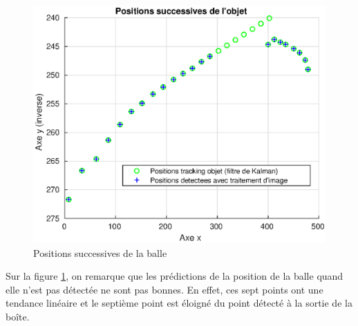 \begin{figure}[H]
\caption{Positions successives de la balle}
\centerline{\includegraphics[width=20cm]{Images/Resultats/PositionsSuccessivesDeLObjet2}}
\label{4}
\end{figure}

Sur la figure \ref{4}, on remarque que les prédictions de la position de la balle quand elle n'est pas détectée ne sont pas bonnes. En effet, ces sept points ont une tendance linéaire et le septième point est éloigné du point détecté à la sortie de la boîte.




